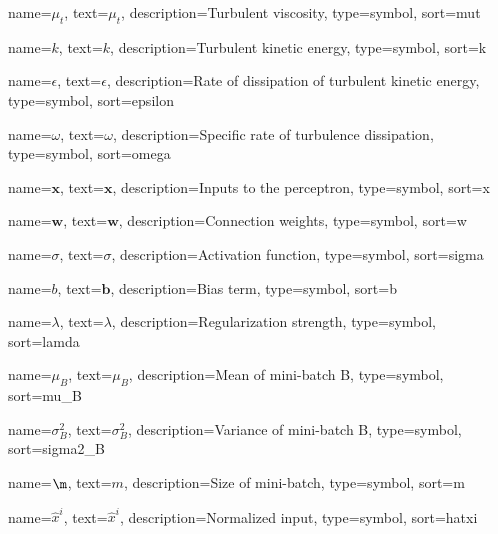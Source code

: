 {
  name={$\mu_t$},
  text={\ensuremath{\mu_t}},
  description={Turbulent viscosity},
  type=symbol,
  sort=mut
}

{
  name={$k$},
  text={\ensuremath{k}},
  description={Turbulent kinetic energy},
  type=symbol,
  sort=k
}

{
  name={$\epsilon$},
  text={\ensuremath{\epsilon}},
  description={Rate of dissipation of turbulent kinetic energy},
  type=symbol,
  sort=epsilon
}

{
  name={$\omega$},
  text={\ensuremath{\omega}},
  description={Specific rate of turbulence dissipation},
  type=symbol,
  sort=omega
}

{
  name={$\mathbf{x}$},
  text={\ensuremath{\mathbf{x}}},
  description={Inputs to the perceptron},
  type=symbol,
  sort=x
}

{
  name={$\mathbf{w}$},
  text={\ensuremath{\mathbf{w}}},
  description={Connection weights},
  type=symbol,
  sort=w
}

{
  name={$\sigma$},
  text={\ensuremath{\sigma}},
  description={Activation function},
  type=symbol,
  sort=sigma
}

{
  name={$b$},
  text={\ensuremath{\mathbf{b}}},
  description={Bias term},
  type=symbol,
  sort=b
}


{
  name={$\lambda$},
  text={\ensuremath{\lambda}},
  description={Regularization strength},
  type=symbol,
  sort=lamda
}

{
  name={$\mu_B$},
  text={\ensuremath{\mu_B}},
  description={Mean of mini-batch B},
  type=symbol,
  sort=mu_B
}

{
  name={$\sigma^2_B$},
  text={\ensuremath{\sigma^2_B}},
  description={Variance of mini-batch B},
  type=symbol,
  sort=sigma2_B
}

{
  name={$\m$},
  text={\ensuremath{m}},
  description={Size of mini-batch},
  type=symbol,
  sort=m
}

{
  name={$\hat{x}^i$},
  text={\ensuremath{\hat{x}^i}},
  description={Normalized input},
  type=symbol,
  sort=hatxi
}

